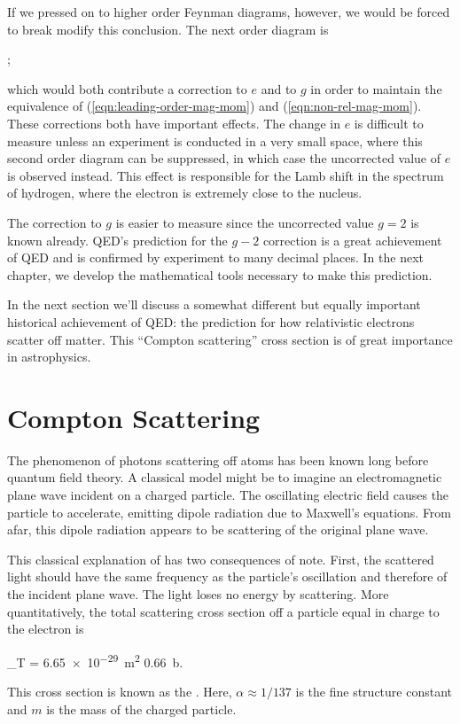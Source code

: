 If we pressed on to higher order Feynman diagrams, however, we would be forced to break modify this conclusion. The next order diagram is
\begin{center}
  ;
\end{center}
which would both contribute a correction to $e$ and to $g$ in order to maintain the equivalence of (\ref{eqn:leading-order-mag-mom}) and (\ref{eqn:non-rel-mag-mom}). These corrections both have important effects. The change in $e$ is difficult to measure unless an experiment is conducted in a very small space, where this second order diagram can be suppressed, in which case the uncorrected value of $e$ is observed instead. This effect is responsible for the Lamb shift in the spectrum of hydrogen, where the electron is extremely close to the nucleus.

The correction to $g$ is easier to measure since the uncorrected value $g=2$ is known already. QED's prediction for the $g-2$ correction is a great achievement of QED and is confirmed by experiment to many decimal places. In the next chapter, we develop the mathematical tools necessary to make this prediction.

In the next section we'll discuss a somewhat different but equally important historical achievement of QED: the prediction for how relativistic electrons scatter off matter. This ``Compton scattering'' cross section is of great importance in astrophysics.

\section{Compton Scattering}

The phenomenon of photons scattering off atoms has been known long before quantum field theory. A classical model might be to imagine an electromagnetic plane wave incident on a charged particle. The oscillating electric field causes the particle to accelerate, emitting dipole radiation due to Maxwell's equations. From afar, this dipole radiation appears to be scattering of the original plane wave.

This classical explanation of  has two consequences of note. First, the scattered light should have the same frequency as the particle's oscillation and therefore of the incident plane wave. The light loses no energy by scattering. More quantitatively, the total scattering cross section off a particle equal in charge to the electron is
\begin{e}
  \sigma_T =  \approx \SI{6.65e-29}{\meter\squared} \approx \SI{0.66}{\barn}.
\end{e}
This cross section is known as the . Here, $\alpha \approx 1/137$ is the fine structure constant and $m$ is the mass of the charged particle.

